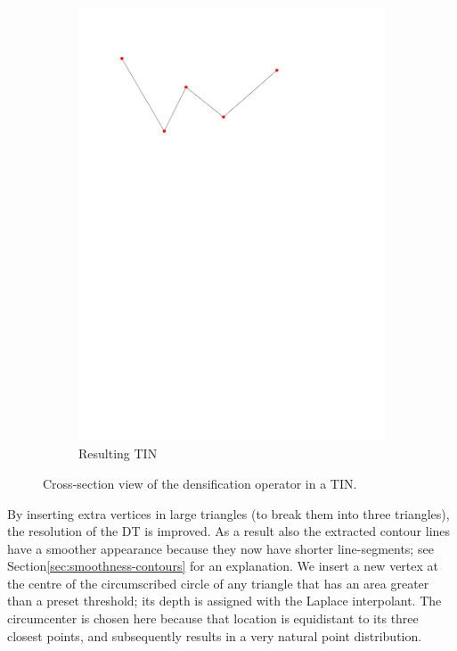 \begin{figure}
\begin{subfigure}[b]{0.35\linewidth}
    \includegraphics[width=\textwidth,page=4]{figs/1Ddensop.pdf}
    \caption{Resulting TIN}\label{fig:1Ddensop:d}
  \end{subfigure}
  \caption{Cross-section view of the densification operator in a TIN.}
\label{fig:1Ddensop}
\end{figure}

By inserting extra vertices in large triangles (to break them into three triangles), the resolution of the DT is improved.
As a result also the extracted contour lines have a smoother appearance because they now have shorter line-segments; see Section\ref{sec:smoothness-contours} for an explanation.
We insert a new vertex at the centre of the circumscribed circle of any triangle that has an area greater than a preset threshold; its depth is assigned with the Laplace interpolant.
The circumcenter is chosen here because that location is equidistant to its three closest points, and subsequently results in a very natural point distribution.

